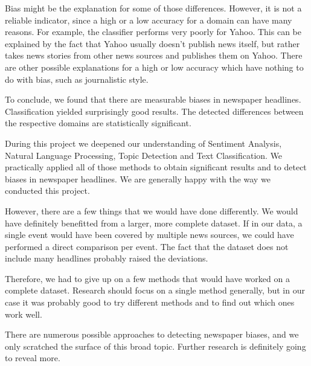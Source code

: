 \documentclass[final]{ieee}
\begin{document}
Bias might be the explanation for some of those differences. However, it is not a reliable indicator, since a high or a low accuracy for a domain can have many reasons. For example, the classifier performs very poorly for Yahoo. This can be explained by the fact that Yahoo usually doesn't publish news itself, but rather takes news stories from other news sources and publishes them on Yahoo. There are other possible explanations for a high or low accuracy which have nothing to do with bias, such as journalistic style.

To conclude, we found that there are measurable biases in newspaper headlines. Classification yielded surprisingly good results. The detected differences between the respective domains are statistically significant.

During this project we deepened our understanding of Sentiment Analysis, Natural Language Processing, Topic Detection and Text Classification. We practically applied all of those methods to obtain significant results and to detect biases in newspaper headlines. We are generally happy with the way we conducted this project.

However, there are a few things that we would have done differently. We would have definitely benefitted from a larger, more complete dataset. If in our data, a single event would have been covered by multiple news sources, we could have performed a direct comparison per event. The fact that the dataset does not include many headlines probably raised the deviations.

Therefore, we had to give up on a few methods that would have worked on a complete dataset. Research should focus on a single method generally, but in our case it was probably good to try different methods and to find out which ones work well.

There are numerous possible approaches to detecting newspaper biases, and we only scratched the surface of this broad topic. Further research is definitely going to reveal more.

           
\end{document}
